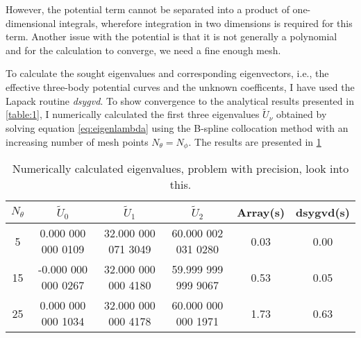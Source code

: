 However, the potential term cannot be separated into a product of one-dimensional integrals, wherefore integration in two dimensions is required for this term. Another issue with the potential is that it is not generally a polynomial and for the calculation to converge, we need a fine enough mesh. 
 
To calculate the sought eigenvalues and corresponding eigenvectors, i.e., the effective three-body potential curves and the unknown coefficents, I have used the Lapack routine \textit{dsygvd}. To show convergence to the analytical results presented in \cref{table:1}, I numerically calculated the first three eigenvalues $\tilde{U}_{\nu}$ obtained by solving equation \eqref{eq:eigenlambda} using the B-spline collocation method with an increasing number of mesh points $N_{\theta}=N_{\phi}$. The results are presented in \cref{table:2} 

\begin{table}[h!]
	\centering
	\begin{tabular}{||c c c c c c||} 
		\hline
		$N_{\theta}$ & $\tilde{U}_0$ & $\tilde{U}_1$ & $\tilde{U}_2$ &  Array(s) & dsygvd(s)
		\Tstrut\Bstrut \\ [0.7ex]
		\hline\hline
		5	   & 0.000 000 000 0109   & 32.000 000 071 3049 & 60.000 002 031 0280 & 0.03 & 0.00  \\
		15     & -0.000 000 000 0267 & 32.000 000 000 4180 & 59.999 999 999 9067  & 0.53 & 0.05 \\
		25 & 0.000 000 000 1034 & 32.000 000 000 4178 & 60.000 000 000 1971& 1.73& 0.63 \\ [1ex] 
		\hline
	\end{tabular}
	\caption{Numerically calculated eigenvalues, problem with precision, look into this.}
	\label{table:2}
\end{table}

